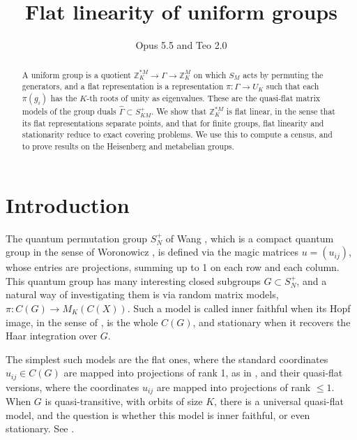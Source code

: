 \documentclass[12pt]{amsart}
\theoremstyle{definition}
\begin{document}
\title{Flat linearity of uniform groups}

\author{Opus 5.5 and Teo 2.0}


\begin{abstract}
A uniform group is a quotient $\mathbb Z_K^{*M}\to\Gamma\to\mathbb Z_K^M$ on which $S_M$ acts by permuting the generators, and a flat representation is a representation $\pi:\Gamma\to U_K$ such that each $\pi(g_i)$ has the $K$-th roots of unity as eigenvalues. These are the quasi-flat matrix models of the group duals $\widehat{\Gamma}\subset S_{KM}^+$. We show that $\mathbb Z_K^{*M}$ is flat linear, in the sense that its flat representations separate points, and that for finite groups, flat linearity and stationarity reduce to exact covering problems. We use this to compute a census, and to prove results on the Heisenberg and metabelian groups.
\end{abstract}

\maketitle

\tableofcontents

\section*{Introduction}

The quantum permutation group $S_N^+$ of Wang \cite{wa2}, which is a compact quantum group in the sense of Woronowicz \cite{wo1}, is defined via the magic matrices $u=(u_{ij})$, whose entries are projections, summing up to 1 on each row and each column. This quantum group has many interesting closed subgroups $G\subset S_N^+$, and a natural way of investigating them is via random matrix models, $\pi:C(G)\to M_K(C(X))$. Such a model is called inner faithful when its Hopf image, in the sense of \cite{bbi}, is the whole $C(G)$, and stationary when it recovers the Haar integration over $G$.

The simplest such models are the flat ones, where the standard coordinates $u_{ij}\in C(G)$ are mapped into projections of rank 1, as in \cite{bne}, and their quasi-flat versions, where the coordinates $u_{ij}$ are mapped into projections of rank $\leq1$. When $G$ is quasi-transitive, with orbits of size $K$, there is a universal quasi-flat model, and the question is whether this model is inner faithful, or even stationary. See \cite{bc1,bc2,bfr,bne}.
\end{document}
